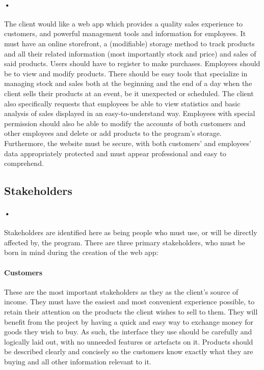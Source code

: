 \documentclass{article}
\begin{document}
    \paragraph{•}
    The client would like a web app which provides a quality sales experience to customers, and powerful management tools and information for employees. 
    It must have an online storefront, a (modifiable) storage method to track products and all their related information (most importantly stock and price) and sales of said products. 
    Users should have to register to make purchases. 
    Employees should be to view and modify products. 
    There should be easy tools that specialize in managing stock and sales both at the beginning and the end of a day when the client sells their products at an event, be it unexpected or scheduled. 
    The client also specifically requests that employees be able to view statistics and basic analysis of sales displayed in an easy-to-understand way. 
    Employees with special permission should also be able to modify the accounts of both customers and other employees and delete or add products to the program’s storage. 
    Furthermore, the website must be secure, with both customers’ and employees’ data appropriately protected and must appear professional and easy to comprehend.
    
    \subsection{Stakeholders}
    \paragraph{•}
    Stakeholders are identified here as being people who must use, or will be directly affected by, the program. 
    There are three primary stakeholders, who must be born in mind during the creation of the web app:
    \paragraph{Customers}
    These are the most important stakeholders as they as the client’s source of income. 
    They must have the easiest and most convenient experience possible, to retain their attention on the products the client wishes to sell to them. 
    They will benefit from the project by having a quick and easy way to exchange money for goods they wish to buy. 
    As such, the interface they use should be carefully and logically laid out, with no unneeded features or artefacts on it. 
    Products should be described clearly and concisely so the customers know exactly what they are buying and all other information relevant to it.
\end{document}
